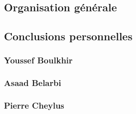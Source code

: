 \documentclass{article}
\begin{document}
    \subsection{Organisation générale}
    \subsection{Conclusions personnelles}
        \subsubsection{Youssef Boulkhir}
        \subsubsection{Asaad Belarbi}
        \subsubsection{Pierre Cheylus}
\end{document}
